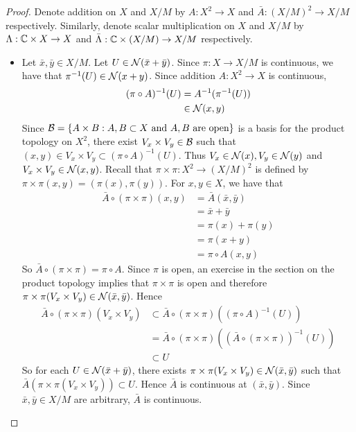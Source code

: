 \documentclass{book}
\begin{document}
	\begin{proof}
		Denote addition on $X$ and $X /M$ by $A: X^2 \rightarrow X$ and $\bar{A}:(X /M)^2 \rightarrow X/ M$ respectively. Similarly, denote scalar multiplication on $X$ and $X /M$ by $\Lambda: \mathbb{C} \times X \rightarrow X$ and $\bar{\Lambda}:\mathbb{C} \times (X /M) \rightarrow X/ M$ respectively. 
		\begin{itemize}
			\item Let $\bar{x}, \bar{y} \in X /M$. Let $U \in \mathcal{N}(\bar{x} + \bar{y})$. Since $\pi: X \rightarrow X / M$ is continuous, we have that $\pi^{-1}(U) \in \mathcal{N}(x+y)$. Since addition $A: X^2 \rightarrow X$ is continuous,
			\begin{align*}
				(\pi \circ A)^{-1}(U) 
				& = A^{-1}(\pi^{-1}(U)) \\
				&\in \mathcal{N}(x,y)
			\end{align*}
			Since $\mathcal{B} = \{A \times B: A,B \subset X \text{ and $A,B$ are open}\}$ is a basis for the product topology on $X^2$, there exist $V_x \times V_y \in \mathcal{B}$ such that $(x,y) \in V_x \times V_y \subset (\pi \circ A)^{-1}(U)$. Thus $V_x \in \mathcal{N}(x), V_y \in \mathcal{N}(y)$ and $V_x \times V_y \in \mathcal{N}(x,y)$. Recall that $\pi \times \pi: X^2 \rightarrow (X /M)^2$ is defined by $\pi \times \pi (x,y) = (\pi(x), \pi(y))$. For $x,y \in X$, we have that 
			\begin{align*}
				\bar{A}\circ (\pi \times \pi)(x,y)
				& = \bar{A}(\bar{x}, \bar{y}) \\
				& = \bar{x} + \bar{y} \\
				&= \pi(x) + \pi(y) \\
				&= \pi (x + y) \\
				&= \pi \circ A (x,y) 
			\end{align*}
			So $\bar{A}\circ (\pi \times \pi) = \pi \circ A$.  Since $\pi$ is open, an exercise in the section on the product topology implies that $\pi \times \pi$ is open and therefore $\pi \times \pi(V_x \times V_y) \in \mathcal{N}(\bar{x}, \bar{y})$. Hence
			\begin{align*}
				\bar{A} \circ (\pi \times \pi) (V_x \times V_y) 
				& \subset \bar{A} \circ (\pi \times \pi)((\pi \circ A)^{-1}(U)) \\
				& = \bar{A} \circ (\pi \times \pi)((\bar{A} \circ (\pi \times \pi))^{-1}(U)) \\
				& \subset U
			\end{align*} 
			So for each $U \in \mathcal{N}(\bar{x} + \bar{y})$, there exists $\pi \times \pi(V_x \times V_y) \in \mathcal{N}(\bar{x}, \bar{y})$ such that $\bar{A}(\pi \times \pi(V_x \times V_y)) \subset U$. Hence $\bar{A}$ is continuous at $(\bar{x}, \bar{y})$. Since $\bar{x}, \bar{y} \in X/ M$ are arbitrary, $\bar{A}$ is continuous. 

\end{itemize}
\end{proof}
\end{document}

